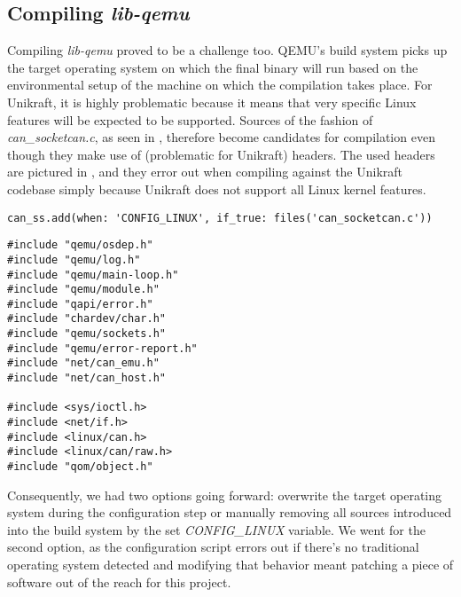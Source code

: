 \subsection{Compiling \textit{lib-qemu}}
\label{subsec:compiling-qemu}

Compiling \textit{lib-qemu} proved to be a challenge too.
QEMU's build system picks up the target operating system on which the final binary will run based on the environmental setup of the machine on which the compilation takes place.
For Unikraft, it is highly problematic because it means that very specific Linux features will be expected to be supported.
Sources of the fashion of \textit{can_socketcan.c}, as seen in , therefore become candidates for compilation even though they make use of (problematic for Unikraft) headers.
The used headers are pictured in , and they error out when compiling against the Unikraft codebase simply because Unikraft does not support all Linux kernel features.

\begin{lstlisting}
can_ss.add(when: 'CONFIG_LINUX', if_true: files('can_socketcan.c'))
\end{lstlisting}

\begin{lstlisting}
#include "qemu/osdep.h"
#include "qemu/log.h"
#include "qemu/main-loop.h"
#include "qemu/module.h"
#include "qapi/error.h"
#include "chardev/char.h"
#include "qemu/sockets.h"
#include "qemu/error-report.h"
#include "net/can_emu.h"
#include "net/can_host.h"
    
#include <sys/ioctl.h>
#include <net/if.h>
#include <linux/can.h>
#include <linux/can/raw.h>
#include "qom/object.h"    
\end{lstlisting}

Consequently, we had two options going forward: overwrite the target operating system during the configuration step or manually removing all sources introduced into the build system by the set \textit{CONFIG_LINUX} variable.
We went for the second option, as the configuration script errors out if there's no traditional operating system detected and modifying that behavior meant patching a piece of software out of the reach for this project.

